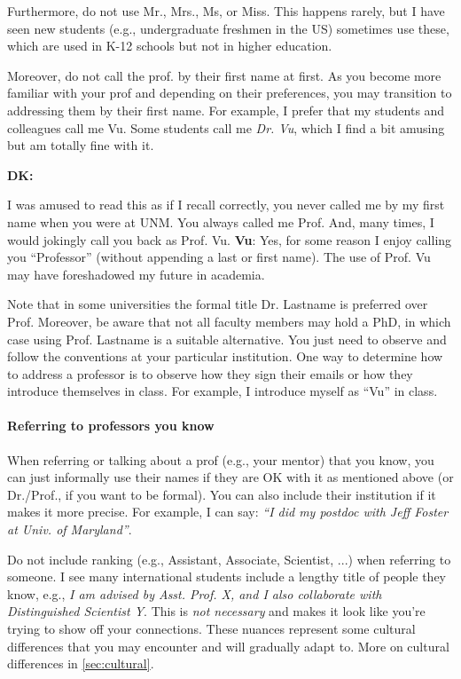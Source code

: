 \documentclass[oneside,11pt,dvipsnames]{book}
\newenvironment{commentbox}[1][]{
  \small
  \begin{mybox}
    {\small \textbf{#1}}
  }{
  \end{mybox}
}
\begin{document}
Furthermore, do not use Mr., Mrs., Ms, or Miss. This happens rarely, but I have seen  new students (e.g., undergraduate freshmen in the US) sometimes use these, which are used in K-12 schools but not in higher education.

Moreover, do not call the prof. by their first name at first.  As you become more familiar with your prof and depending on their preferences, you may transition to addressing them by their first name.
For example, I prefer that my students and colleagues call me Vu. Some students call me \emph{Dr. Vu}, which I find a bit amusing but am totally fine with it.

\begin{commentbox}[DK:]
  I was amused to read this as if I recall correctly, you never called me by my first name when you were at UNM. You always called me Prof. And, many times, I would jokingly call you back as Prof. Vu.
  \tcblower
  \textbf{Vu}: Yes, for some reason I enjoy calling you ``Professor'' (without appending a last or first name).  The use of Prof. Vu may have foreshadowed my future in academia.
\end{commentbox}

Note that in some universities the formal title Dr. Lastname is preferred over Prof. Moreover, be aware that not all faculty members may hold a PhD, in which case using Prof. Lastname is a suitable alternative. 	You just need to observe and follow the conventions at your particular institution. One way to determine how to address a professor is to observe how they sign their emails or how they introduce themselves in class. For example, I introduce myself as ``Vu'' in class.



\paragraph{Referring to professors you know} When referring or talking about a prof (e.g., your mentor) that you know, you can just informally use their names if they are OK with it as mentioned above (or Dr./Prof., if you want to be formal). You can also include their institution if it makes it more precise.  For example, I can say:  \emph{``I did my postdoc with Jeff Foster at Univ. of Maryland''}.

Do not include ranking (e.g., Assistant, Associate, Scientist, ...) when referring to someone. I see many international students include a lengthy title of people they know, e.g., \emph{I am advised by Asst. Prof. X, and I also collaborate with Distinguished Scientist Y}.  This is \emph{not necessary} and makes it look like you're trying to show off your connections. These nuances represent some cultural differences that you may encounter and will gradually adapt to. More on cultural differences in \autoref{sec:cultural}.
\end{document}
